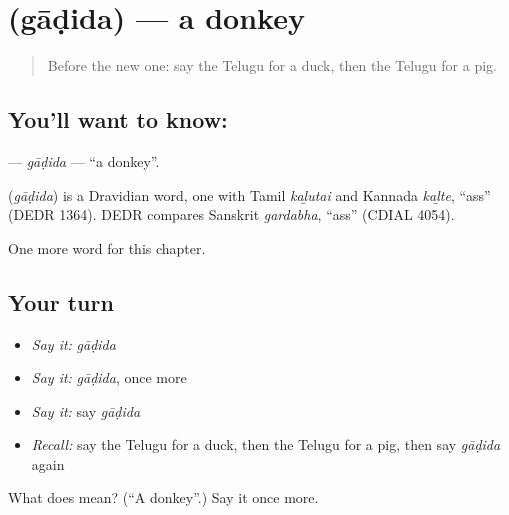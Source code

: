 \section[\texorpdfstring{\te{గాడిద} (gāḍida)}{గాడిద (gāḍida)}]{ (gāḍida) — a donkey}

\label{lesson:TE-C126-gadida}



\begin{quote}
Before the new one: say the Telugu for a duck, then the Telugu for a pig.
\end{quote}

\subsection*{You'll want to know: }
\textbf{} — \emph{gāḍida} — \textquotedblleft{}a donkey\textquotedblright{}.

\begin{cousinweb}
\textbf{} (\emph{gāḍida}) is a Dravidian word, one with Tamil \emph{kaḻutai} and Kannada \emph{kaḻte}, \textquotedblleft{}ass\textquotedblright{} (DEDR 1364). DEDR compares Sanskrit \emph{gardabha}, \textquotedblleft{}ass\textquotedblright{} (CDIAL 4054).
\end{cousinweb}

\begin{grammarlens}[title={What you've built}]
One more word for this chapter.
\end{grammarlens}

\subsection*{Your turn}
\begin{itemize}
\raggedright
  \item \emph{Say it:} \emph{gāḍida}
  \item \emph{Say it:} \emph{gāḍida}, once more
  \item \emph{Say it:} say \emph{gāḍida}
  \item \emph{Recall:} say the Telugu for a duck, then the Telugu for a pig, then say \emph{gāḍida} again
\end{itemize}

\begin{tcolorbox}[breakable,colback=teal!4,colframe=teal!35!black,title={Before you move on}]
What does  mean? (\textquotedblleft{}A donkey\textquotedblright{}.) Say it once more.
\end{tcolorbox}
